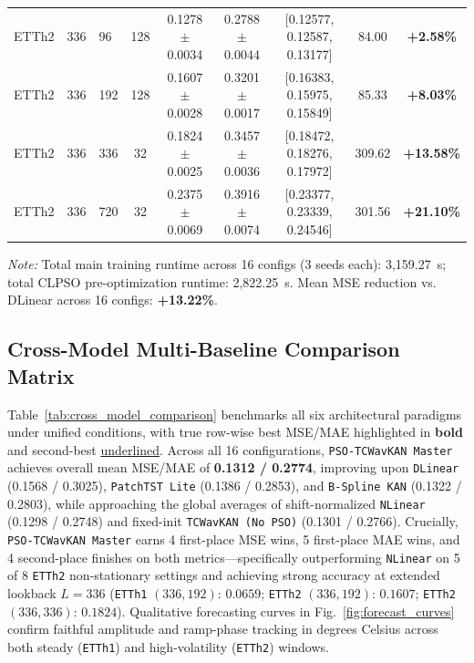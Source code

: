 \documentclass[pdflatex,sn-mathphys-num,referee,lineno]{sn-jnl}
\theoremstyle{thmstyleone}
\theoremstyle{thmstyletwo}
\theoremstyle{thmstylethree}
\begin{document}
\begin{table}[htbp]
{\begin{tabular}{lllcccccc}
\addlinespace
ETTh2 & 336 & 96 & 128 & 0.1278 $\pm$ 0.0034 & 0.2788 $\pm$ 0.0044 & [0.12577, 0.12587, 0.13177] & 84.00 & \textbf{+2.58\%} \\
ETTh2 & 336 & 192 & 128 & 0.1607 $\pm$ 0.0028 & 0.3201 $\pm$ 0.0017 & [0.16383, 0.15975, 0.15849] & 85.33 & \textbf{+8.03\%} \\
ETTh2 & 336 & 336 & 32 & 0.1824 $\pm$ 0.0025 & 0.3457 $\pm$ 0.0036 & [0.18472, 0.18276, 0.17972] & 309.62 & \textbf{+13.58\%} \\
ETTh2 & 336 & 720 & 32 & 0.2375 $\pm$ 0.0069 & 0.3916 $\pm$ 0.0074 & [0.23377, 0.23339, 0.24546] & 301.56 & \textbf{+21.10\%} \\
\bottomrule
\end{tabular}}
\vspace{4pt}
\footnotesize{\textit{Note:} Total main training runtime across 16 configs (3 seeds each): 3,159.27~s; total CLPSO pre-optimization runtime: 2,822.25~s. Mean MSE reduction vs. DLinear across 16 configs: \textbf{+13.22\%}.}
\end{table}

\subsection{Cross-Model Multi-Baseline Comparison Matrix}\label{subsec:baseline_matrix}
Table~\ref{tab:cross_model_comparison} benchmarks all six architectural paradigms under unified conditions, with true row-wise best MSE/MAE highlighted in \textbf{bold} and second-best \underline{underlined}. Across all 16 configurations, \texttt{PSO-TCWavKAN Master} achieves overall mean MSE/MAE of \textbf{0.1312 / 0.2774}, improving upon \texttt{DLinear} (0.1568 / 0.3025), \texttt{PatchTST Lite} (0.1386 / 0.2853), and \texttt{B-Spline KAN} (0.1322 / 0.2803), while approaching the global averages of shift-normalized \texttt{NLinear} (0.1298 / 0.2748) and fixed-init \texttt{TCWavKAN (No PSO)} (0.1301 / 0.2766). Crucially, \texttt{PSO-TCWavKAN Master} earns 4 first-place MSE wins, 5 first-place MAE wins, and 4 second-place finishes on both metrics---specifically outperforming \texttt{NLinear} on 5 of 8 \texttt{ETTh2} non-stationary settings and achieving strong accuracy at extended lookback $L=336$ (\texttt{ETTh1} $(336, 192)$: $0.0659$; \texttt{ETTh2} $(336, 192)$: $0.1607$; \texttt{ETTh2} $(336, 336)$: $0.1824$). Qualitative forecasting curves in Fig.~\ref{fig:forecast_curves} confirm faithful amplitude and ramp-phase tracking in degrees Celsius across both steady (\texttt{ETTh1}) and high-volatility (\texttt{ETTh2}) windows.
\end{document}
